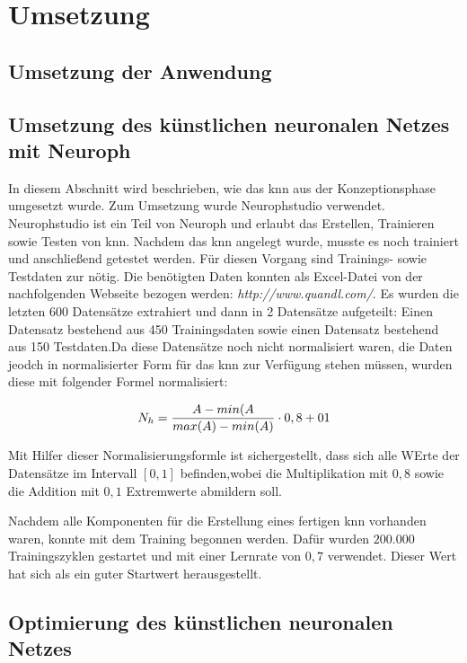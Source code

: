 \chapter{Umsetzung} %

\section{Umsetzung der Anwendung} %

\section{Umsetzung des künstlichen neuronalen Netzes mit Neuroph} %
\label{section:Umsetzung des künstlichen neuronalen Netzes mit Neuroph} %

In diesem Abschnitt wird beschrieben, wie das \acs{knn} aus der Konzeptionsphase umgesetzt wurde. Zum Umsetzung wurde Neurophstudio verwendet. Neurophstudio ist ein Teil von Neuroph und erlaubt das Erstellen, Trainieren sowie Testen von \acs{knn}.
Nachdem das \acs{knn} angelegt wurde, musste es noch trainiert und anschließend getestet werden. Für diesen Vorgang sind Trainings- sowie Testdaten zur nötig. Die benötigten Daten konnten als Excel-Datei von der nachfolgenden Webseite bezogen werden: 
\textit{http://www.quandl.com/}. Es wurden die letzten 600 Datensätze extrahiert und dann in 2 Datensätze aufgeteilt: Einen Datensatz bestehend aus 450 Trainingsdaten sowie einen Datensatz bestehend aus 150 Testdaten.Da diese Datensätze noch nicht normalisiert waren, die Daten jeodch in normalisierter Form für das \acs{knn} zur Verfügung stehen müssen, wurden diese mit folgender Formel normalisiert:

\begin{equation}\formelentry{Normalisierungsformel}
  N_h = \frac{A-min(A}{max(A)-min(A)}\cdot0,8+01
\end{equation}

Mit Hilfer dieser Normalisierungsformle ist sichergestellt, dass sich alle WErte der Datensätze im Intervall $[0,1]$ befinden,wobei die Multiplikation mit $0,8$ sowie die Addition mit $0,1$ Extremwerte abmildern soll.

Nachdem alle Komponenten für die Erstellung eines fertigen \acs{knn} vorhanden waren, konnte mit dem Training begonnen werden. Dafür wurden $200.000$ Trainingszyklen gestartet und mit einer Lernrate von $0,7$ verwendet. Dieser Wert hat sich als ein guter Startwert herausgestellt.


\section{Optimierung des künstlichen neuronalen Netzes}

